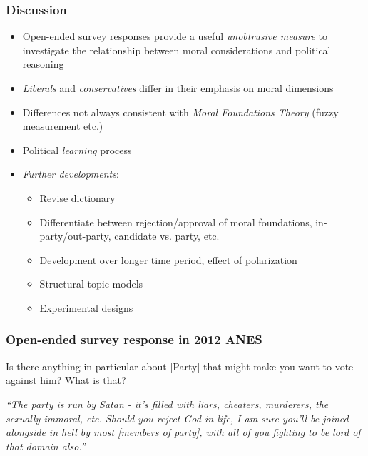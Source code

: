 \begin{frame}%
  \frametitle{Discussion}
  \begin{itemize}
\item Open-ended survey responses provide a useful \emph{unobtrusive measure} to investigate the relationship between moral considerations and political reasoning
\item \emph{Liberals} and \emph{conservatives} differ in their emphasis on moral dimensions
\item Differences not always consistent with \emph{Moral Foundations Theory} (fuzzy measurement etc.)
\item Political \emph{learning} process
\item \emph{Further developments}:
    \begin{itemize}
     \item Revise dictionary
     \item Differentiate between rejection/approval of moral foundations, in-party/out-party, candidate vs. party, etc.
     \item Development over longer time period, effect of polarization
     \item Structural topic models \citep{roberts2014structural}
     \item Experimental designs
    \end{itemize}
  \end{itemize}
\end{frame}


\begin{frame}%
\frametitle{Open-ended survey response in 2012 ANES}
\begin{exampleblock}{Is there anything in particular about [Party] that might make you want to vote against him? What is that?}
  \begin{center}
    \textit{``The party is run by Satan - it's filled with liars, cheaters, murderers, the sexually immoral, etc. Should you reject God in life, I am sure you'll be joined alongside in hell by most [members of party], with all of you fighting to be lord of that domain also.''}
  \end{center}
\end{exampleblock}
\end{frame}
